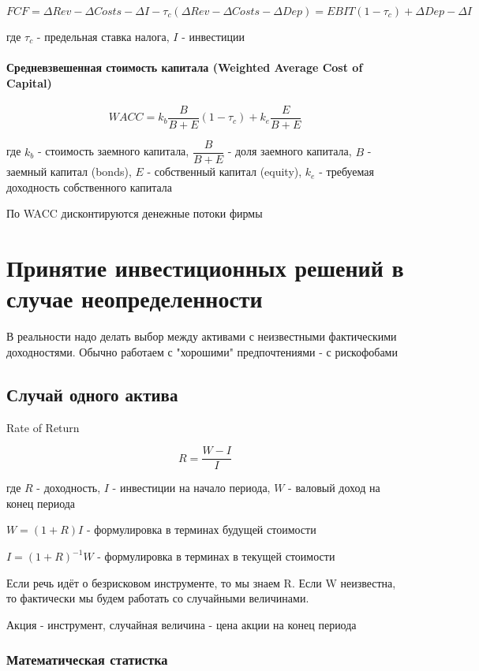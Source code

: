\documentclass[a4paper,12pt]{article} %
\begin{document}
 \[ FCF = \Delta Rev - \Delta Costs - \Delta I - \tau_c (\Delta Rev - \Delta Costs - \Delta Dep )  = EBIT(1-\tau_c) + \Delta Dep - \Delta I \]
 
 где $ \tau_c $ - 
предельная ставка налога, $ I $
- инвестиции 


\paragraph{Средневзвешенная стоимость капитала (Weighted Average Cost of Capital)} 

\[ WACC = k_b \dfrac{B}{B+E} (1-\tau_c) +  k_e \dfrac{E}{B+E} \]

где $  k_b $  - стоимость заемного капитала,
$ \dfrac{B}{B+E} $  - доля заемного капитала,  
$ B $ - заемный капитал (bonds), $ E $ - собственный капитал (equity),   $  k_e $  - требуемая доходность  собственного капитала 

По WACC дисконтируются денежные потоки фирмы 

\section{Принятие инвестиционных решений в случае неопределенности}

В реальности надо делать выбор между активами с неизвестными фактическими доходностями.  
Обычно работаем с "хорошими" предпочтениями - с рискофобами

\subsection{Случай одного актива }

Rate of Return  

\[ R = \dfrac{W - I}{ I} \]

где $ R $ - доходность, $ I $ - инвестиции на начало периода, $ W $ - валовый доход на конец периода 

$ W = (1+R) I  $ - формулировка в терминах будущей стоимости 

$ I = (1+R)^{-1} W $ - формулировка в терминах в текущей стоимости 

Если речь идёт о безрисковом инструменте,  то мы знаем R.  
Если W неизвестна, то
 фактически мы будем работать со случайными величинами.
 
  Акция - инструмент, случайная величина - цена акции на конец периода 
  
  \subsubsection{Математическая статистка}
\end{document}
